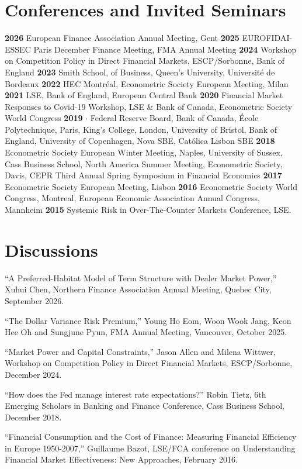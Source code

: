 \documentclass[margin,line, 11pt]{res}
\newenvironment{list1}{
  \begin{list}{\ding{113}}{%
      \setlength{\itemsep}{0in}
      \setlength{\parsep}{0in} \setlength{\parskip}{0in}
      \setlength{\topsep}{0in} \setlength{\partopsep}{0in} 
      \setlength{\leftmargin}{0.17in}}}{\end{list}}
\begin{document}
\begin{resume}
\section{\sc Conferences and Invited Seminars} 
\begin{list1}
\item[]  \textbf{2026} European Finance Association Annual Meeting, Gent \textbf{2025} EUROFIDAI-ESSEC Paris December Finance Meeting, FMA Annual Meeting \textbf{2024} Workshop on Competition Policy in Direct Financial Markets, ESCP/Sorbonne, Bank of England \textbf{2023} Smith School, of Business, Queen's University, Universit\'e de Bordeaux \textbf{2022} HEC Montr\'eal, Econometric Society European Meeting, Milan \textbf{2021} LSE, Bank of England, European Central Bank \textbf{2020} Financial Market Responses to Covid-19 Workshop, LSE \& Bank of Canada, Econometric Society World Congress \textbf{2019} $\cdot$ Federal Reserve Board, Bank of Canada, \'Ecole Polytechnique, Paris, King's College, London, University of Bristol, Bank of England, University of Copenhagen, Nova SBE, Cat\'olica Lisbon SBE \textbf{2018} Econometric Society European Winter Meeting, Naples, University of Sussex, Cass Business School, North America Summer Meeting, Econometric Society, Davis, CEPR Third Annual Spring Symposium in Financial Economics  \textbf{2017}  Econometric Society European Meeting, Lisbon  \textbf{2016}  Econometric Society World Congress, Montreal, European Economic Association Annual Congress, Mannheim \textbf{2015} Systemic Risk in Over-The-Counter Markets Conference, LSE.
\end{list1}

\section{\sc Discussions} 
\begin{list1}
\item[] ``A Preferred-Habitat Model of Term Structure with Dealer Market Power,'' Xuhui Chen, Northern Finance Association Annual Meeting, Quebec City, September 2026.
\item[] ``The Dollar Variance Risk Premium,'' Young Ho Eom, Woon Wook Jang, Keon Hee Oh and Sungjune Pyun, FMA Annual Meeting, Vancouver, October 2025.
\item[] ``Market Power and Capital Constraints,'' Jason Allen and Milena Wittwer, Workshop on Competition Policy in Direct Financial Markets, ESCP/Sorbonne, December 2024.
\item[] ``How does the Fed manage interest rate expectations?'' Robin Tietz, 6th Emerging Scholars in Banking and Finance Conference, Cass Business School, December 2018.
\item[] ``Financial Consumption and the Cost of Finance: Measuring Financial Efficiency in Europe 1950-2007,'' Guillaume Bazot, LSE/FCA conference on Understanding Financial Market Effectiveness: New Approaches, February 2016. 
\end{list1}


\end{resume}
\end{document}
